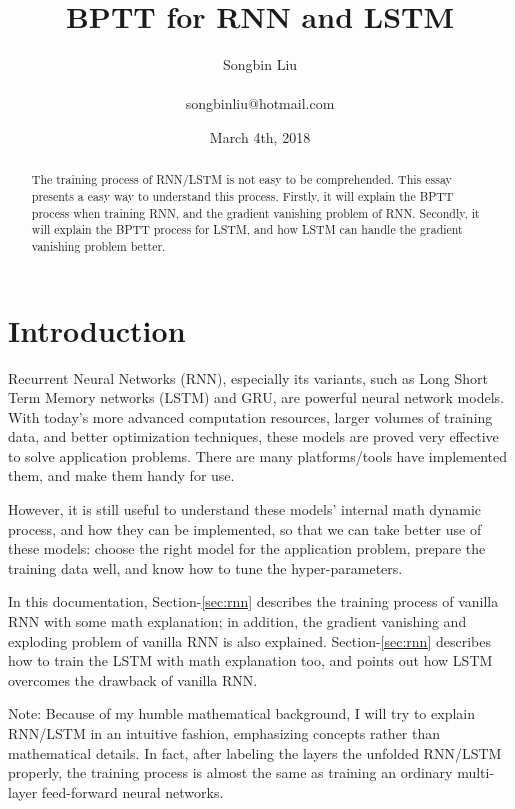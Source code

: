 \documentclass[english]{article}
\begin{document}


\author{Songbin Liu \\\\ songbinliu@hotmail.com} %
\title{BPTT for RNN and LSTM} %
\date{March 4th, 2018} %
\maketitle{} %

\begin{abstract}
The training process of RNN/LSTM is not easy to be comprehended. This essay presents a easy way to understand this process.
Firstly, it will explain the BPTT process when training RNN, and the gradient vanishing problem of RNN.  Secondly, it will explain the BPTT
process for LSTM, and how LSTM can handle the gradient vanishing problem better.

\end{abstract}

\section{Introduction}
Recurrent Neural Networks (RNN), especially its variants, such as Long Short Term Memory networks (LSTM) and GRU,
are powerful neural network models. With today's more advanced computation resources, larger volumes of training data,
and better optimization techniques, these models are proved very effective to solve application problems.  There are many
platforms/tools have implemented them, and make them handy for use.

However, it is still useful to understand these models' internal math dynamic process, and how they can be implemented, so that
we can take better use of these models: choose the right model for the application problem, prepare the training data well, and know how to
tune the hyper-parameters.

In this documentation, Section-\ref{sec:rnn} describes the training process of vanilla RNN with some math explanation; 
in addition, the gradient vanishing and exploding problem of vanilla RNN is also explained.  Section-\ref{sec:rnn} describes how to
train the LSTM with math explanation too, and points out how LSTM overcomes the drawback of vanilla RNN.

Note: Because of my humble mathematical background, I will try to explain RNN/LSTM in an intuitive fashion, emphasizing concepts rather than 
mathematical details. In fact, after labeling the layers the unfolded RNN/LSTM properly, the training process is almost the same as training an
ordinary multi-layer feed-forward neural networks.
\end{document}
